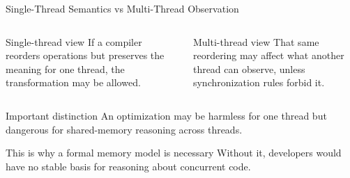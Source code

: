 \documentclass[aspectratio=169,11pt]{beamer}
\begin{document}
	\begin{frame}{Single-Thread Semantics vs Multi-Thread Observation}
		\begin{columns}[T]
			\begin{block}{Single-thread view}
				If a compiler reorders operations but preserves the meaning for one thread, the transformation may be allowed.
			\end{block}
			
			\begin{block}{Multi-thread view}
				That same reordering may affect what another thread can observe, unless synchronization rules forbid it.
			\end{block}
		\end{columns}
		
		\vspace{0.35cm}
		
		\begin{exampleblock}{Important distinction}
			An optimization may be harmless for one thread but dangerous for shared-memory reasoning across threads.
		\end{exampleblock}
		
		\vspace{0.25cm}
		
		\begin{alertblock}{This is why a formal memory model is necessary}
			Without it, developers would have no stable basis for reasoning about concurrent code.
		\end{alertblock}
	\end{frame}
	
\end{document}
